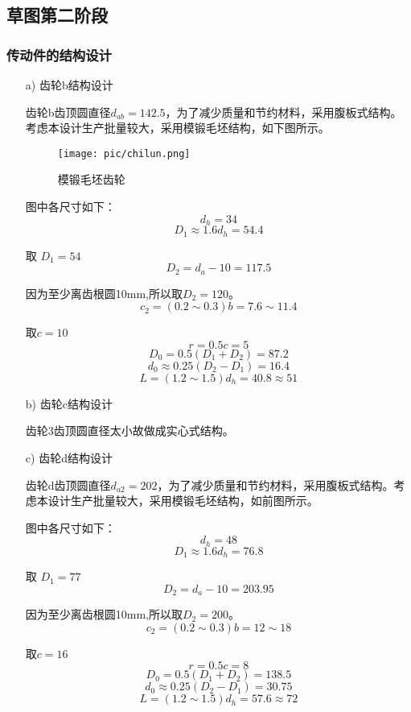 \subsection{草图第二阶段}
\subsubsection{传动件的结构设计}
\begin{itemize}
	\item [a)]齿轮b结构设计
	\par 齿轮b齿顶圆直径$d_{ab}=142.5$，为了减少质量和节约材料，采用腹板式结构。考虑本设计生产批量较大，采用模锻毛坯结构，如下图所示。
	\begin{figure}[H]
		\begin{center}
			\caption{模锻毛坯齿轮}
			\texttt{[image: pic/chilun.png]}
		\end{center}
	\end{figure}
	\par 图中各尺寸如下：
		$$d_h=34$$
		$$D_1\approx 1.6d_h=54.4$$
	\par 取 $D_1=54$
		$$D_2=d_a-10=117.5$$
	\par 因为至少离齿根圆10mm,所以取$D_2=120$。
		$$c_2=\left(0.2\sim 0.3\right)b=7.6\sim 11.4$$
	\par 取$c=10$
		$$r=0.5c=5$$
		$$D_0=0.5\left(D_1+D_2\right)=87.2$$
		$$d_0\approx 0.25\left(D_2-D_1\right)=16.4$$
		$$L=\left(1.2\sim 1.5\right)d_h=40.8\approx 51$$


	\item[b)]齿轮c结构设计
	\par 齿轮3齿顶圆直径太小故做成实心式结构。
	\item[c)]齿轮d结构设计
	\par 齿轮d齿顶圆直径$d_{a2}=202$，为了减少质量和节约材料，采用腹板式结构。考虑本设计生产批量较大，采用模锻毛坯结构，如前图所示。
	\par 图中各尺寸如下：
	$$d_h=48$$
	$$D_1\approx 1.6d_h=76.8$$
	\par 取 $D_1=77$
	$$D_2=d_a-10=203.95$$
	\par 因为至少离齿根圆10mm,所以取$D_2=200$。
	$$c_2=\left(0.2\sim 0.3\right)b=12\sim 18$$
	\par 取$c=16$
	$$r=0.5c=8$$
	$$D_0=0.5\left(D_1+D_2\right)=138.5$$
	$$d_0\approx 0.25\left(D_2-D_1\right)=30.75$$
	$$L=\left(1.2\sim 1.5\right)d_h=57.6\approx 72$$
	
	
\end{itemize}
